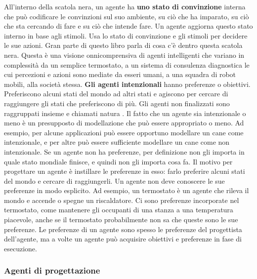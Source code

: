\documentclass[a4paper]{extarticle}
\begin{document}
All'interno della scatola nera, un agente ha \textbf{uno stato di convinzione} interna che può codificare le convinzioni sul suo ambiente, su ciò che ha imparato, su ciò che sta cercando di fare e su ciò che intende fare. Un agente aggiorna questo stato interno in base agli stimoli. Usa lo stato di convinzione e gli stimoli per decidere le sue azioni. Gran parte di questo libro parla di cosa c'è dentro questa scatola nera. Questa è una visione onnicomprensiva di agenti intelligenti che variano in complessità da un semplice termostato, a un sistema di consulenza diagnostica le cui percezioni e azioni sono mediate da esseri umani, a una squadra di robot mobili, alla società stessa. \textbf{Gli agenti intenzionali} hanno preferenze o obiettivi. Preferiscono alcuni stati del mondo ad altri stati e agiscono per cercare di raggiungere gli stati che preferiscono di più. Gli agenti non finalizzati sono raggruppati insieme e chiamati natura . Il fatto che un agente sia intenzionale o meno è un presupposto di modellazione che può essere appropriato o meno. Ad esempio, per alcune applicazioni può essere opportuno modellare un cane come intenzionale, e per altre può essere sufficiente modellare un cane come non intenzionale. Se un agente non ha preferenze, per definizione non gli importa in quale stato mondiale finisce, e quindi non gli importa cosa fa. Il motivo per progettare un agente è instillare le preferenze in esso: farlo preferire alcuni stati del mondo e cercare di raggiungerli. Un agente non deve conoscere le sue preferenze in modo esplicito. Ad esempio, un termostato è un agente che rileva il mondo e accende o spegne un riscaldatore. Ci sono preferenze incorporate nel termostato, come mantenere gli occupanti di una stanza a una temperatura piacevole, anche se il termostato probabilmente non sa che queste sono le sue preferenze. Le preferenze di un agente sono spesso le preferenze del progettista dell'agente, ma a volte un agente può acquisire obiettivi e preferenze in fase di esecuzione.

\subsubsection{Agenti di progettazione}
\end{document}

